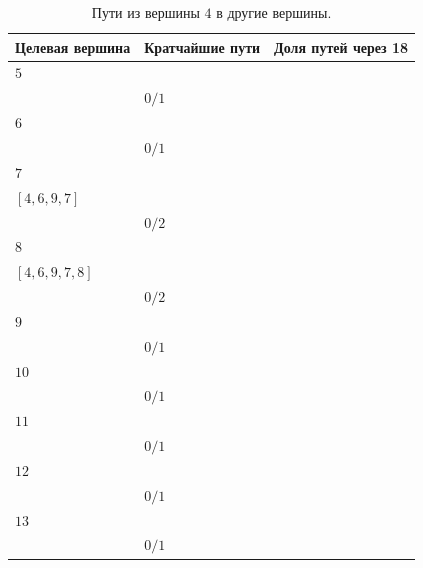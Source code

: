 \documentclass[12pt, a4paper]{extarticle}
\begin{document}
\begin{table}[h!]
    \caption{Пути из вершины $4$ в другие вершины.}
    \label{tbl:10-4}
    \begin{tabularx}{\textwidth}{|X|X|X|}
        \hline 
        Целевая вершина & Кратчайшие пути & Доля путей через 18 \\
        \hline 
        $5$ & \begin{tabular}{@{}l@{}} $[4, 6, 5]$ \\ \end{tabular} & $0/1$ \\
        \hline
        $6$ & \begin{tabular}{@{}l@{}} $[4, 6]$ \\ \end{tabular} & $0/1$ \\
        \hline
        $7$ & \begin{tabular}{@{}l@{}} $[4, 6, 3, 7]$ \\  $[4, 6, 9, 7]$ \\ \end{tabular} & $0/2$ \\
        \hline
        $8$ & \begin{tabular}{@{}l@{}} $[4, 6, 3, 7, 8]$ \\  $[4, 6, 9, 7, 8]$ \\ \end{tabular} & $0/2$ \\
        \hline
        $9$ & \begin{tabular}{@{}l@{}} $[4, 6, 9]$ \\ \end{tabular} & $0/1$ \\
        \hline
        $10$ & \begin{tabular}{@{}l@{}} $[4, 6, 10]$ \\ \end{tabular} & $0/1$ \\
        \hline
        $11$ & \begin{tabular}{@{}l@{}} $[4, 6, 10, 11]$ \\ \end{tabular} & $0/1$ \\
        \hline
        $12$ & \begin{tabular}{@{}l@{}} $[4, 6, 9, 13, 12]$ \\ \end{tabular} & $0/1$ \\
        \hline
        $13$ & \begin{tabular}{@{}l@{}} $[4, 6, 9, 13]$ \\ \end{tabular} & $0/1$ \\

\end{tabularx}
\end{table}
\end{document}
